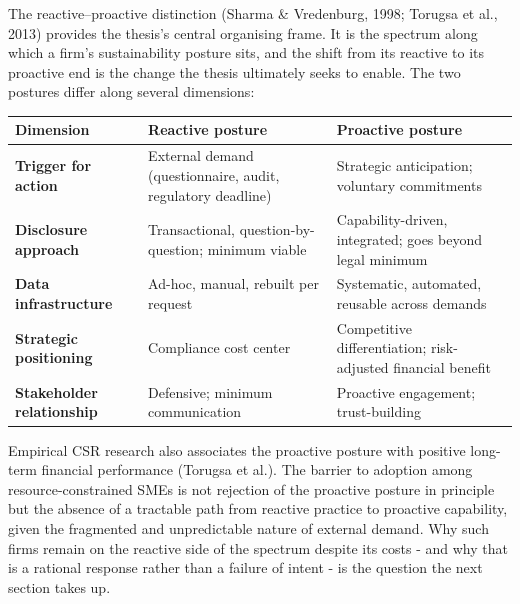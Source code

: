 \documentclass[
]{article}
\newcounter{none} %
\begin{document}
The reactive--proactive distinction (Sharma \& Vredenburg, 1998; Torugsa et al.,
2013) provides the thesis's central organising frame. It is the spectrum along
which a firm's sustainability posture sits, and the shift from its reactive to its
proactive end is the change the thesis ultimately seeks to enable. The two postures
differ along several dimensions:

{\def\LTcaptype{none} %
\begin{longtable}[]{@{}
  >{\raggedright\arraybackslash}p{}
  >{\raggedright\arraybackslash}p{}
  >{\raggedright\arraybackslash}p{}@{}}
\toprule\noalign{}
\begin{minipage}[b]{\linewidth}\raggedright
\textbf{Dimension}
\end{minipage} & \begin{minipage}[b]{\linewidth}\raggedright
\textbf{Reactive posture}
\end{minipage} & \begin{minipage}[b]{\linewidth}\raggedright
\textbf{Proactive posture}
\end{minipage} \\
\midrule\noalign{}
\endhead
\bottomrule\noalign{}
\endlastfoot
\textbf{Trigger for action} & External demand (questionnaire, audit,
regulatory deadline) & Strategic anticipation; voluntary commitments \\
\textbf{Disclosure approach} & Transactional, question-by-question;
minimum viable & Capability-driven, integrated; goes beyond legal
minimum \\
\textbf{Data infrastructure} & Ad-hoc, manual, rebuilt per request &
Systematic, automated, reusable across demands \\
\textbf{Strategic positioning} & Compliance cost center & Competitive
differentiation; risk-adjusted financial benefit \\
\textbf{Stakeholder relationship} & Defensive; minimum communication &
Proactive engagement; trust-building \\
\end{longtable}
}

Empirical CSR research also associates the proactive posture with positive
long-term financial performance (Torugsa et al.). The barrier to adoption among
resource-constrained SMEs is not rejection of the proactive posture in principle
but the absence of a tractable path from reactive practice to proactive capability,
given the fragmented and unpredictable nature of external demand. Why such firms
remain on the reactive side of the spectrum despite its costs - and why that is a
rational response rather than a failure of intent - is the question the next
section takes up.
\end{document}

